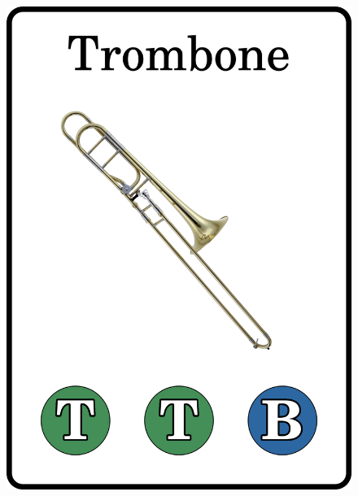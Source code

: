 \documentclass[a6paper, 12pt, parskip=half, DIV=14]{scrartcl}
\begin{document}
\begin{figure}[h]
\includegraphics[scale=0.035]{Images/CardImages/trombone_display_front.png}
\ 

\end{figure}
\end{document}
